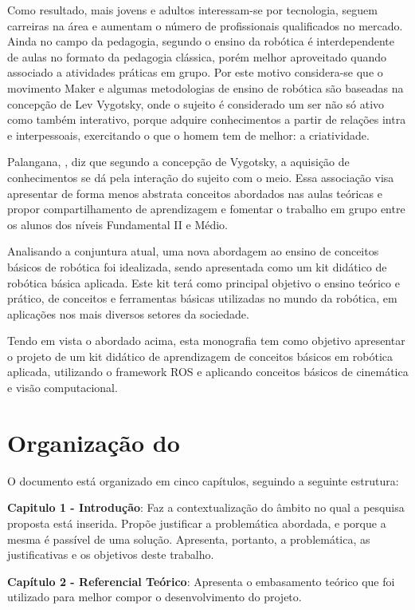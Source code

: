 Como resultado, mais jovens e adultos interessam-se por tecnologia, seguem carreiras na área e aumentam o número de profissionais qualificados no mercado.
Ainda no campo da pedagogia, segundo \cite{Mataric} o ensino da robótica é interdependente de aulas no formato da pedagogia clássica, porém melhor aproveitado quando associado a atividades práticas em grupo. Por este motivo considera-se que o movimento Maker e algumas metodologias de ensino de robótica são baseadas na concepção de Lev Vygotsky, onde o sujeito é considerado um ser não só ativo como também interativo, porque adquire conhecimentos a partir de relações intra e interpessoais, exercitando o que o homem tem de melhor: a criatividade.
 
Palangana, \cite{Palangana}, diz que segundo a concepção de Vygotsky, a aquisição de conhecimentos se dá pela interação do sujeito com o meio. Essa associação visa apresentar de forma menos abstrata conceitos abordados nas aulas teóricas e propor compartilhamento de aprendizagem e fomentar o trabalho em grupo entre os alunos dos níveis Fundamental II e Médio.

Analisando a conjuntura atual, uma nova abordagem ao ensino de conceitos básicos de robótica foi idealizada, sendo apresentada como um kit didático de robótica básica aplicada. Este kit terá como principal objetivo o ensino teórico e prático, de conceitos e ferramentas básicas utilizadas no mundo da robótica, em aplicações nos mais diversos setores da sociedade.
 
Tendo em vista o abordado acima, esta monografia tem como objetivo apresentar o projeto de um kit didático de aprendizagem de conceitos básicos em robótica aplicada, utilizando o framework ROS e aplicando conceitos básicos de cinemática e visão computacional.

\section{Organização do \thetypework}
\label{section:organizacao}
O documento está organizado em cinco capítulos, seguindo a seguinte estrutura:

\textbf{Capitulo 1 - Introdução}: Faz a contextualização do âmbito no qual a pesquisa proposta
está inserida. Propõe justificar a problemática abordada, e porque a mesma é passível de uma solução. Apresenta, portanto, a problemática, as justificativas e os objetivos deste trabalho.


\textbf{Capítulo 2 - Referencial Teórico}: Apresenta o embasamento teórico que foi utilizado para melhor compor o desenvolvimento do projeto.

